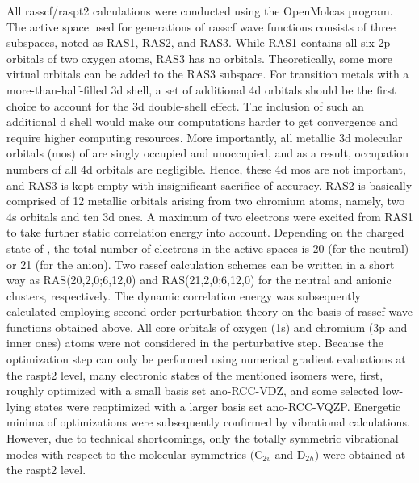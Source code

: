 \begin{refsection}
All \acrshort{rasscf}/\acrshort{raspt2}\cite{raspt2} calculations were conducted using the OpenMolcas program.\cite{molcas} The active space used for generations of \acrshort{rasscf} wave functions consists of three subspaces, noted as RAS1, RAS2, and RAS3. While RAS1 contains all six 2p orbitals of two oxygen atoms, RAS3 has no orbitals. Theoretically, some more virtual orbitals can be added to the RAS3 subspace. For transition metals with a more-than-half-filled 3d shell, a set of additional 4d orbitals should be the first choice to account for the 3d double-shell effect. \cite{doubleshell} The inclusion of such an additional d shell would make our computations harder to get convergence and require higher computing resources. More importantly, all metallic 3d molecular orbitals (\acrshort{mo}s) of  are singly occupied and unoccupied, and as a result, occupation numbers of all 4d orbitals are negligible. Hence, these 4d \acrshort{mo}s are not important, and RAS3 is kept empty with insignificant sacrifice of accuracy. RAS2 is basically comprised of 12 metallic orbitals arising from two chromium atoms, namely, two 4s orbitals and ten 3d ones. A maximum of two electrons were excited from RAS1 to take further static correlation energy into account. Depending on the charged state of , the total number of electrons in the active spaces is 20 (for the neutral) or 21 (for the anion). Two \acrshort{rasscf} calculation schemes can be written in a short way as RAS(20,2,0;6,12,0) and RAS(21,2,0;6,12,0) for the neutral and anionic clusters, respectively. The dynamic correlation energy was subsequently calculated employing second-order perturbation theory on the basis of \acrshort{rasscf} wave functions obtained above. All core orbitals of oxygen (1s) and chromium (3p and inner ones) atoms were not considered in the perturbative step. Because the optimization step can only be performed using numerical gradient evaluations at the \acrshort{raspt2} level, many electronic states of the mentioned isomers were, first, roughly optimized with a small basis set \acrshort{ano}-RCC-VDZ, \cite{ano-cr,ano-oxy} and some selected low-lying states were reoptimized with a larger basis set \acrshort{ano}-RCC-VQZP. \cite{ano-cr, ano-oxy} Energetic minima of optimizations were subsequently confirmed by vibrational calculations. However, due to technical shortcomings, only the totally symmetric vibrational modes with respect to the molecular symmetries (C$_{2v}$ and D$_{2h}$) were obtained at the \acrshort{raspt2} level.






\end{refsection}
